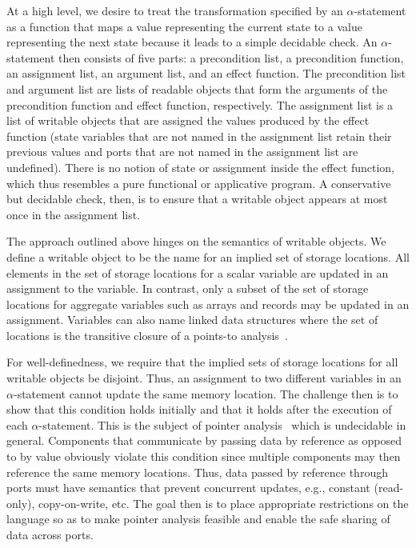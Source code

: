 At a high level, we desire to treat the transformation specified by an $\alpha$-statement as a function that maps a value representing the current state to a value representing the next state because it leads to a simple decidable check.
An $\alpha$-statement then consists of five parts:  a precondition list, a precondition function, an assignment list, an argument list, and an effect function.
The precondition list and argument list are lists of readable objects that form the arguments of the precondition function and effect function, respectively.
The assignment list is a list of writable objects that are assigned the values produced by the effect function (state variables that are not named in the assignment list retain their previous values and ports that are not named in the assignment list are undefined).
There is no notion of state or assignment inside the effect function, which thus resembles a pure functional or applicative program.
A conservative but decidable check, then, is to ensure that a writable object appears at most once in the assignment list.

The approach outlined above hinges on the semantics of writable objects.
We define a writable object to be the name for an implied set of storage locations.
All elements in the set of storage locations for a scalar variable are updated in an assignment to the variable.
In contrast, only a subset of the set of storage locations for aggregate variables such as arrays and records may be updated in an assignment.
Variables can also name linked data structures where the set of locations is the transitive closure of a points-to analysis~\cite{hind2001pointer}.

For well-definedness, we require that the implied sets of storage locations for all writable objects be disjoint.
Thus, an assignment to two different variables in an $\alpha$-statement cannot update the same memory location.
The challenge then is to show that this condition holds initially and that it holds after the execution of each $\alpha$-statement.
This is the subject of pointer analysis~\cite{hind2001pointer} which is undecidable in general.
Components that communicate by passing data by reference as opposed to by value obviously violate this condition since multiple components may then reference the same memory locations.
Thus, data passed by reference through ports must have semantics that prevent concurrent updates, e.g., constant (read-only), copy-on-write, etc.
The goal then is to place appropriate restrictions on the language so as to make pointer analysis feasible and enable the safe sharing of data across ports.

